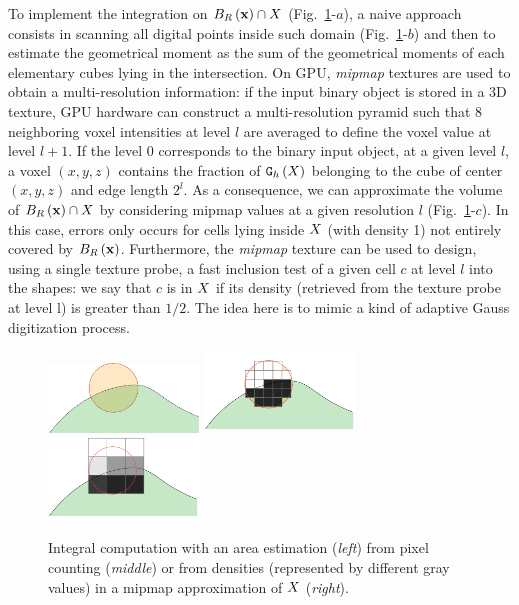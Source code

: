 \documentclass{llncs}
\begin{document}
To implement the integration on $B_{R}\left(\mathbf{x}\right) \cap X$
(Fig.~\ref{fig:approx}-$a$), a naive approach consists in scanning all digital
points inside such domain (Fig.~\ref{fig:approx}-$b$) and then to estimate the
geometrical moment as the sum of the geometrical moments of each elementary
cubes lying in the intersection. On GPU, \emph{mipmap} textures are used to
obtain a multi-resolution information: if the input binary object is stored in a
3D texture, GPU hardware can construct a multi-resolution pyramid such that 8
neighboring voxel intensities at level $l$ are averaged to define the voxel
value at level $l+1$. If the level 0 corresponds to the binary input object, at
a given level $l$, a voxel $(x,y,z)$ contains the fraction of $\mathtt{G}_{h}\left(X\right)$ belonging
to the cube of center $(x,y,z)$ and edge length $2^l$. As a consequence, we can
approximate the volume of $B_{R}\left(\mathbf{x}\right)\cap X$ by considering mipmap values
at a given resolution $l$ (Fig.~\ref{fig:approx}-$c$). In this case, errors only
occurs for cells lying inside $X$ (with density 1) not entirely covered by
$B_{R}\left(\mathbf{x}\right)$. Furthermore, the \emph{mipmap} texture can be used to design,
using a single texture probe, a fast inclusion test of a given cell $c$ at level
$l$ into the shapes: we say that $c$ is in $X$ if its density (retrieved
from the texture probe at level l) is greater than $1/2$. The idea here is to
mimic a kind of adaptive Gauss digitization process.

\begin{figure}
  \vspace{-0.35cm}
  \begin{center}
    {\includegraphics[width=4.0cm]{figs/approx1}}
    {\includegraphics[width=4.0cm]{figs/approx-reg-1}}
    {\includegraphics[width=4.0cm]{figs/approx-reg-2}}
  \end{center}
  \vspace{-0.35cm}
  \caption{Integral computation with an area estimation (\emph{left}) from pixel
    counting (\emph{middle}) or from densities (represented by different
    gray values) in a mipmap approximation of $X$ (\emph{right}).}
  \label{fig:approx}
  \vspace{-0.35cm}
\end{figure}
\end{document}
